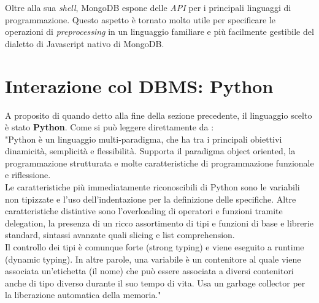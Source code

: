         Oltre alla sua \textit{shell}, MongoDB espone delle \textit{API} per i principali linguaggi di programmazione. Questo aspetto è tornato molto utile per specificare le operazioni di \textit{preprocessing} in un linguaggio familiare e più facilmente gestibile del dialetto di Javascript nativo di MongoDB.

\section{Interazione col DBMS: Python}

    A proposito di quando detto alla fine della sezione precedente, il linguaggio scelto è stato \textbf{Python}. Come si può leggere direttamente da \cite{pywiki}:\\

    "Python è un linguaggio multi-paradigma, che ha tra i principali obiettivi dinamicità, semplicità e flessibilità. Supporta il paradigma object oriented, la programmazione strutturata e molte caratteristiche di programmazione funzionale e riflessione. \\

    Le caratteristiche più immediatamente riconoscibili di Python sono le variabili non tipizzate e l'uso dell'indentazione per la definizione delle specifiche. Altre caratteristiche distintive sono l'overloading di operatori e funzioni tramite delegation, la presenza di un ricco assortimento di tipi e funzioni di base e librerie standard, sintassi avanzate quali slicing e list comprehension. \\

    Il controllo dei tipi è comunque forte (strong typing) e viene eseguito a runtime (dynamic typing). In altre parole, una variabile è un contenitore al quale viene associata un'etichetta (il nome) che può essere associata a diversi contenitori anche di tipo diverso durante il suo tempo di vita. Usa un garbage collector per la liberazione automatica della memoria." \\


